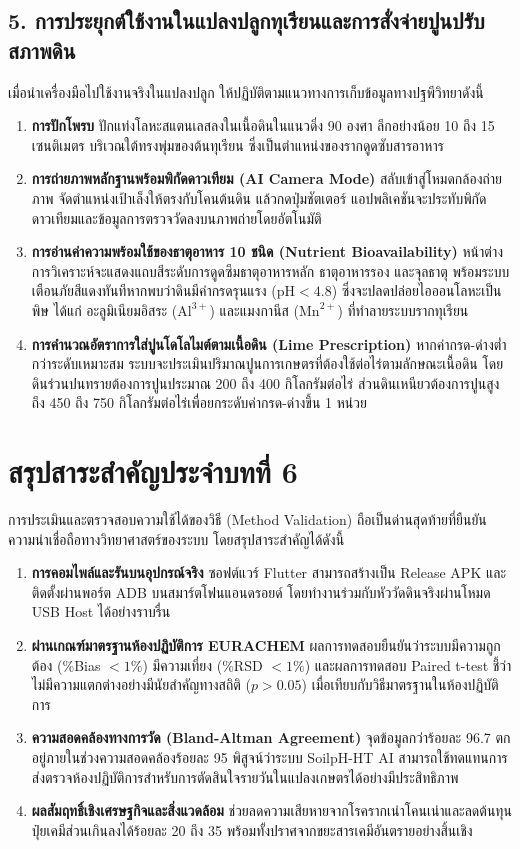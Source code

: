 \subsection{5. การประยุกต์ใช้งานในแปลงปลูกทุเรียนและการสั่งจ่ายปูนปรับสภาพดิน}
เมื่อนำเครื่องมือไปใช้งานจริงในแปลงปลูก ให้ปฏิบัติตามแนวทางการเก็บข้อมูลทางปฐพีวิทยาดังนี้
\begin{enumerate}
    \item \textbf{การปักโพรบ} ปักแท่งโลหะสแตนเลสลงในเนื้อดินในแนวดิ่ง 90 องศา ลึกอย่างน้อย 10 ถึง 15 เซนติเมตร บริเวณใต้ทรงพุ่มของต้นทุเรียน ซึ่งเป็นตำแหน่งของรากดูดซับสารอาหาร
    \item \textbf{การถ่ายภาพหลักฐานพร้อมพิกัดดาวเทียม (AI Camera Mode)} สลับเข้าสู่โหมดกล้องถ่ายภาพ จัดตำแหน่งเป้าเล็งให้ตรงกับโคนต้นดิน แล้วกดปุ่มชัตเตอร์ แอปพลิเคชันจะประทับพิกัดดาวเทียมและข้อมูลการตรวจวัดลงบนภาพถ่ายโดยอัตโนมัติ
    \item \textbf{การอ่านค่าความพร้อมใช้ของธาตุอาหาร 10 ชนิด (Nutrient Bioavailability)} หน้าต่างการวิเคราะห์จะแสดงแถบสีระดับการดูดซึมธาตุอาหารหลัก ธาตุอาหารรอง และจุลธาตุ พร้อมระบบเตือนภัยสีแดงทันทีหากพบว่าดินมีค่ากรดรุนแรง ($\text{pH} < 4.8$) ซึ่งจะปลดปล่อยไอออนโลหะเป็นพิษ ได้แก่ อะลูมิเนียมอิสระ ($\text{Al}^{3+}$) และแมงกานีส ($\text{Mn}^{2+}$) ที่ทำลายระบบรากทุเรียน
    \item \textbf{การคำนวณอัตราการใส่ปูนโดโลไมต์ตามเนื้อดิน (Lime Prescription)} หากค่ากรด-ด่างต่ำกว่าระดับเหมาะสม ระบบจะประเมินปริมาณปูนการเกษตรที่ต้องใช้ต่อไร่ตามลักษณะเนื้อดิน โดยดินร่วนปนทรายต้องการปูนประมาณ 200 ถึง 400 กิโลกรัมต่อไร่ ส่วนดินเหนียวต้องการปูนสูงถึง 450 ถึง 750 กิโลกรัมต่อไร่เพื่อยกระดับค่ากรด-ด่างขึ้น 1 หน่วย
\end{enumerate}

\section{สรุปสาระสำคัญประจำบทที่ 6}

การประเมินและตรวจสอบความใช้ได้ของวิธี (Method Validation) ถือเป็นด่านสุดท้ายที่ยืนยันความน่าเชื่อถือทางวิทยาศาสตร์ของระบบ โดยสรุปสาระสำคัญได้ดังนี้
\begin{enumerate}
    \item \textbf{การคอมไพล์และรันบนอุปกรณ์จริง} ซอฟต์แวร์ Flutter สามารถสร้างเป็น Release APK และติดตั้งผ่านพอร์ต ADB บนสมาร์ตโฟนแอนดรอยด์ โดยทำงานร่วมกับหัววัดดินจริงผ่านโหมด USB Host ได้อย่างราบรื่น
    \item \textbf{ผ่านเกณฑ์มาตรฐานห้องปฏิบัติการ EURACHEM} ผลการทดสอบยืนยันว่าระบบมีความถูกต้อง (\%Bias $< 1\%$) มีความเที่ยง (\%RSD $< 1\%$) และผลการทดสอบ Paired t-test ชี้ว่าไม่มีความแตกต่างอย่างมีนัยสำคัญทางสถิติ ($p > 0.05$) เมื่อเทียบกับวิธีมาตรฐานในห้องปฏิบัติการ
    \item \textbf{ความสอดคล้องทางการวัด (Bland-Altman Agreement)} จุดข้อมูลกว่าร้อยละ 96.7 ตกอยู่ภายในช่วงความสอดคล้องร้อยละ 95 พิสูจน์ว่าระบบ SoilpH-HT AI สามารถใช้ทดแทนการส่งตรวจห้องปฏิบัติการสำหรับการตัดสินใจรายวันในแปลงเกษตรได้อย่างมีประสิทธิภาพ
    \item \textbf{ผลสัมฤทธิ์เชิงเศรษฐกิจและสิ่งแวดล้อม} ช่วยลดความเสียหายจากโรครากเน่าโคนเน่าและลดต้นทุนปุ๋ยเคมีส่วนเกินลงได้ร้อยละ 20 ถึง 35 พร้อมทั้งปราศจากขยะสารเคมีอันตรายอย่างสิ้นเชิง
\end{enumerate}

